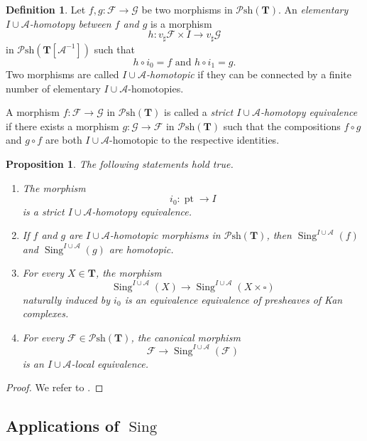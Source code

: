 \documentclass[11pt, a4paper]{amsart}
\newtheorem{prop}[thm]{Proposition}
\theoremstyle{definition}
\newtheorem{df}[thm]{Definition}
\numberwithin{equation}{subsection}
\newcommand{\Sing}{\operatorname{Sing}}              %
\newcommand{\pt}[1]{\mathrm{\pt}_{#1}}
\newcommand{\cA}{\mathcal{A}}
\newcommand{\cF}{\mathcal{F}}
\newcommand{\cG}{\mathcal{G}}
\newcommand{\bT}{\mathbf{T}}
\newcommand{\boxx}{\square}
\def\pt{\operatorname{pt}}
\newcommand{\infPsh}{\mathcal{P}\mathrm{sh}}
\begin{document}
\begin{df}
\label{Singboxx.2}
Let $f,g\colon \cF\to \cG$ be two morphisms in $\infPsh(\bT)$.
An \emph{elementary $I\cup \cA$-homotopy between $f$ and $g$} is a morphism
\[
h\colon v_\sharp \cF\times I \to v_\sharp \cG
\]
in $\infPsh(\bT[\cA^{-1}])$ such that
\[
h\circ i_0=f
\text{ and }
h\circ i_1=g.
\]
Two morphisms are called \emph{$I\cup \cA$-homotopic} if they can be connected by 
a finite number of elementary $I\cup \cA$-homotopies.

A morphism $f\colon \cF\to \cG$ in $\infPsh(\bT)$ is called a 
\emph{strict $I\cup \cA$-homotopy equivalence} if there exists 
a morphism $g\colon \cG\to \cF$ in $\infPsh(\bT)$ such that the compositions $f\circ g$ and $g\circ f$ are both $I\cup \cA$-homotopic to the respective identities.
\end{df}

\begin{prop}
\label{Singboxx.3}
The following statements hold true.
\begin{enumerate}
\item [{\rm (1)}]
The morphism
\[
i_0\colon \pt \to I
\]
is a strict $I\cup \cA$-homotopy equivalence.
\item [{\rm (2)}]
If $f$ and $g$ are $I\cup \cA$-homotopic morphisms in $\infPsh(\bT)$, 
then $\Sing^{I\cup \cA}(f)$ and $\Sing^{I\cup \cA}(g)$ are  homotopic.
\item [{\rm (3)}]
For every $X\in \bT$, the morphism
\[
\Sing^{I\cup \cA}(X) \to \Sing^{I\cup \cA}(X\times \boxx) 
\]
naturally induced by $i_0$ is an equivalence equivalence of presheaves of Kan complexes.
\item [{\rm (4)}]
For every $\cF\in \infPsh(\bT)$, the canonical morphism
\[
\cF\to \Sing^{I\cup \cA}(\cF)
\]
is an $I\cup \cA$-local equivalence.
\end{enumerate}
\end{prop}
\begin{proof}
We refer to \cite[Propositions 6.2.3, 6.2.4, 6.2.6, Corollary 6.2.5]{logDM}.
\end{proof}





\subsection{Applications of \texorpdfstring{$\Sing$}{Sing}}
\label{subsection:applicationsSing}
\end{document}
